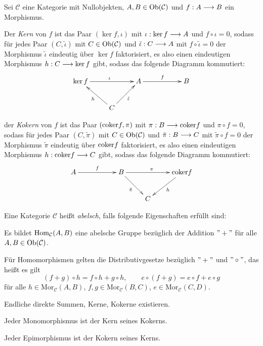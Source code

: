 \documentclass[11pt]{book}
\theoremstyle{nonumberbreak}
\newenvironment{defin}[1][]{\ifthenelse{\equal{#1}{}}{\definition}{\definition[#1]}\rm}{\enddefinition}
\newenvironment{er}[1][]{\ifthenelse{\equal{#1}{}}{\erinner}{\erinner[#1]}\rm}{\enderinner}
\newcommand{\Hom}{\mathrm{Hom} }
\begin{document}
\begin{spacing}{1.4}
\begin{er}   %
Sei $\mathcal{C}$ eine Kategorie mit Nullobjekten, $A,B \in \mathrm{Ob}(\mathcal{C})$ und $f: A \longrightarrow B$ ein Morphismus.
\begin{compactenum}
\item Der \textit{Kern} von $f$ ist das Paar $(\ker f,  \iota)$ mit $\iota: \ker f \longrightarrow A$ und $f \circ \iota = 0$, sodass für jedes Paar $(C, \tilde{\iota})$ mit $C \in \mathrm{Ob}(\mathcal{C})$ und $\tilde{\iota}: C \longrightarrow A$ mit $f \circ \tilde{\iota} = 0$ der Morphismus $\tilde{\iota}$ eindeutig über $\ker f$ faktorisiert, es also einen eindeutigen Morphismus $h: C \longrightarrow \ker f$ gibt, sodass das folgende Diagramm kommutiert:
$$
\begin{xy}
\xymatrix{
\ker f \ar[rr]^{\iota} && A \ar[rr]^f && B \\
& C \ar[lu]^{h} \ar[ru]_{\tilde{\iota}} & &&
}
\end{xy}
$$

\item der \textit{Kokern} von $f$ ist das Paar $(\mathrm{coker} f, \pi)$ mit $\pi: B \longrightarrow \mathrm{coker} f$ und $\pi \circ f=0$, sodass für jedes Paar $(C, \tilde{\pi})$ mit $C \in \mathrm{Ob}(\mathcal{C})$ und $\tilde{\pi}: B \longrightarrow C$ mit $\tilde{\pi} \circ f=0$ der Morphismus $\tilde{\pi}$ eindeutig über $\mathrm{coker} f$ faktorisiert, es also einen eindeutigen Morphismus $h: \mathrm{coker} f \longrightarrow C$ gibt, sodass das folgende Diagramm kommutiert:
$$
\begin{xy}
\xymatrix{
A \ar[rr]^f && B \ar[rr]^{\pi} \ar[rd]_{\tilde{\pi}} && \coker f \ar[ld]^{h} \\ &&& C & 
}
\end{xy}
$$

\end{compactenum}
\end{er}



\begin{defin}  %
Eine Kategorie $\mathcal{C}$ heißt \textit{abelsch}, falls folgende Eigenschaften erfüllt sind:
\begin{compactenum}
\item Es bildet $\Hom_{\C}(A,B)$ eine abelsche Gruppe bezüglich der Addition $"+"$ für alle $A,B \in \mathrm{Ob}(\mathcal{C})$.
\item Für Homomorphismen gelten die Distributivgesetze bezüglich $"+"$ und $"\circ"$, das heißt es gilt
$$(f+g) \circ h = f\circ h + g \circ h, \qquad e \circ (f +g) = e \circ f + e \circ g$$
für alle $h \in \mathrm{Mor}_{\mathcal{C}}(A,B)$, $f,g \in \mathrm{Mor}_{\mathcal{C}}(B,C)$, $e \in \mathrm{Mor}_{\mathcal{C}}(C,D)$.
\item Endliche direkte Summen, Kerne, Kokerne existieren.
\item Jeder Monomorphismus ist der Kern seines Kokerns.
\item Jeder Epimorphismus ist der Kokern seines Kerns.


\end{compactenum}
\end{defin}
\end{spacing}
\end{document}
